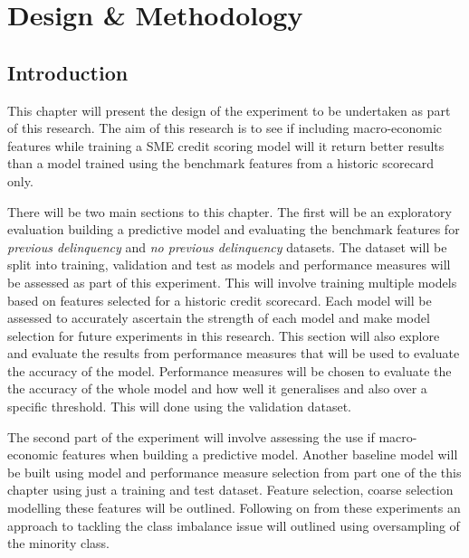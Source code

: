 
\chapter{Design \& Methodology} %

\label{Chapter4} %


\section{Introduction}

This chapter will present the design of the experiment to be undertaken as part of this research. The aim of this research is to see if including macro-economic features while training a SME credit scoring model will it return better results than a model trained using the benchmark features from a historic scorecard only. 

There will be two main sections to this chapter. The first will be an exploratory evaluation building a predictive model and evaluating the benchmark features for \textit{previous delinquency} and \textit{no previous delinquency} datasets. The dataset will be split into training, validation and test as models and performance measures will be assessed as part of this experiment. This will involve training multiple models based on features selected for a historic credit scorecard. Each model will be assessed to accurately ascertain the strength of each model and make model selection for future experiments in this research. This section will also explore and evaluate the results from performance measures that will be used  to evaluate the accuracy of the model. Performance measures will be chosen to evaluate the the accuracy of the whole model and how well it generalises and also over a specific threshold. This will done using the validation dataset. 

The second part of the experiment will involve assessing the use if macro-economic features when building a predictive model. Another baseline model will be built using model and performance measure selection from part one of the this chapter using just a training and test dataset. Feature selection, coarse selection  modelling these features will be outlined. Following on from these experiments an approach to tackling the class imbalance issue will outlined using oversampling of the minority class.


